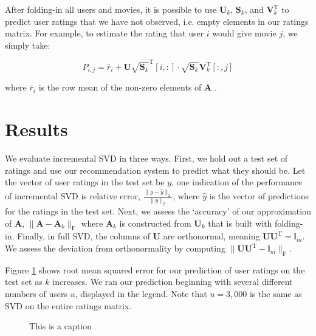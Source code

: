 \documentclass{article} %
\newcommand{\A}{\mathbf{A}}
\newcommand{\T}{\textrm{T}}
\begin{document}
After folding-in all users and movies, it is possible to use $\mathbf{U}_k$, $\mathbf{S}_k$, and $\mathbf{V}_k^{\T}$ to predict user ratings that we have not observed, i.e. empty elements in our ratings matrix.
For example, to estimate the rating that user $i$ would give movie $j$, we simply take:

$$P_{i,j} = \bar{r}_i + \mathbf{U}\sqrt{\mathbf{S}_k}^{\T}[i,:]
\cdot \sqrt{\mathbf{S}_k}\mathbf{V}_k^{\T}[:,j]$$

where $\bar{r}_i$ is the row mean of the non-zero elements of $\A$ \citep{sarwar2002}.

\section{Results}

We evaluate incremental SVD in three ways.
First, we hold out a test set of ratings and use our recommendation system to predict what they should be.
Let the vector of user ratings in the test set be $y$, one indication of
the performance of incremental SVD is relative error, $\frac{\|y - \hat{y}\|_2}{\|y\|_2}$, where $\hat{y}$ is the vector of predictions for the ratings in the test set.
Next, we assess the `accuracy' of our approximation of $\A$, $\|\A - \A_k\|_{\textrm{F}}$ where $\A_k$ is constructed from $\mathbf{U}_k$ that is built with folding-in.
Finally, in full SVD, the columns of $\mathbf{U}$ are orthonormal, meaning $\mathbf{U}\mathbf{U}^{\T} = \mathbb{I}_m$.
We assess the deviation from orthonormality by computing $\|\mathbf{U}\mathbf{U}^{\T} - \mathbb{I}_m\|_{\textrm{F}}$.

Figure \ref{fig:error_small} shows root mean squared error for our prediction of user ratings on the test set as $k$ increases.
We ran our prediction beginning with several different numbers of 
users $u$, displayed in the legend.
Note that $u = 3,000$ is the same as SVD on the entire ratings matrix.

\begin{figure}[H]
\begin{center}
\end{center}
\caption{This is a caption}
\label{fig:error_small}
\end{figure}
\end{document}

